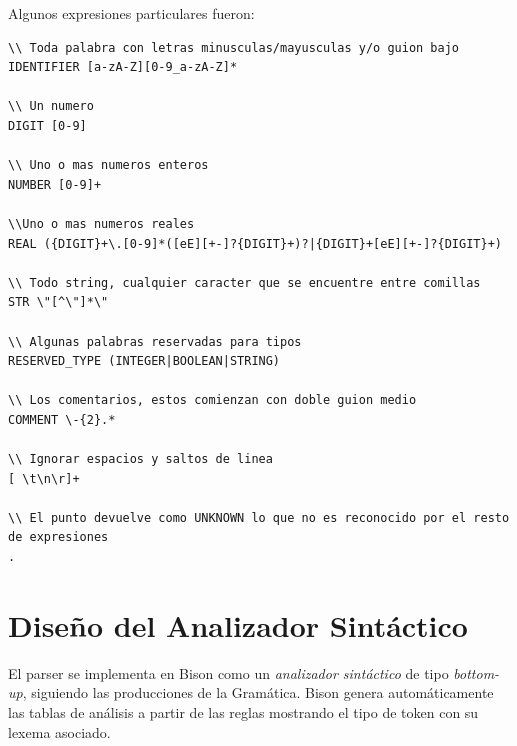 \documentclass[a4paper,12pt]{article}
\begin{document}
\newpage

\noindent
Algunos expresiones particulares fueron:

\begin{lstlisting}[style=myeiffel]
\\ Toda palabra con letras minusculas/mayusculas y/o guion bajo
IDENTIFIER [a-zA-Z][0-9_a-zA-Z]*  

\\ Un numero
DIGIT [0-9]

\\ Uno o mas numeros enteros
NUMBER [0-9]+

\\Uno o mas numeros reales
REAL ({DIGIT}+\.[0-9]*([eE][+-]?{DIGIT}+)?|{DIGIT}+[eE][+-]?{DIGIT}+)

\\ Todo string, cualquier caracter que se encuentre entre comillas
STR \"[^\"]*\"

\\ Algunas palabras reservadas para tipos
RESERVED_TYPE (INTEGER|BOOLEAN|STRING)

\\ Los comentarios, estos comienzan con doble guion medio
COMMENT \-{2}.*

\\ Ignorar espacios y saltos de linea
[ \t\n\r]+ 

\\ El punto devuelve como UNKNOWN lo que no es reconocido por el resto de expresiones
.
\end{lstlisting}

\vspace{6mm}
\section{Diseño del Analizador Sintáctico}
El parser se implementa en Bison como un \emph{analizador sintáctico} de tipo \emph{bottom-up}, siguiendo las producciones de la Gramática. Bison genera automáticamente las tablas de análisis a partir de las reglas mostrando el tipo de token con su lexema asociado.
\end{document}
